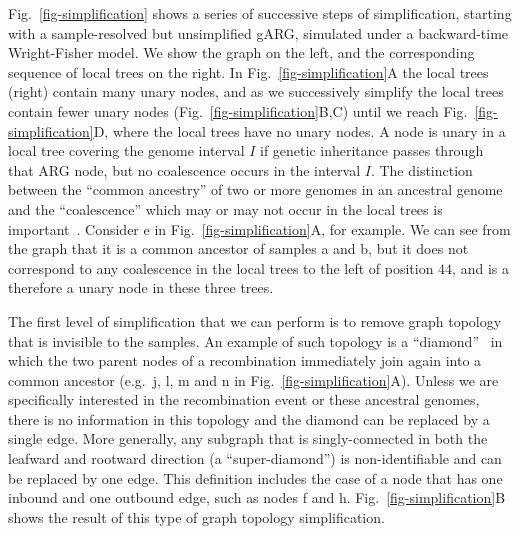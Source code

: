 \documentclass{article}
\newcommand{\noderef}[1]{\textsf{#1}}
\begin{document}
Fig.~\ref{fig-simplification} shows a series of successive steps of
simplification,
starting with a sample-resolved but unsimplified gARG, simulated under a
backward-time Wright-Fisher
model. We show the graph on the left, and the corresponding sequence of
local trees on the right.
In Fig.~\ref{fig-simplification}A the local trees (right)
contain many unary nodes, and as we successively simplify
the local trees contain fewer
unary nodes (Fig.~\ref{fig-simplification}B,C) until
we reach Fig.~\ref{fig-simplification}D, where the local trees
have no unary nodes.
A node is unary in a local tree covering the genome interval $I$
if genetic inheritance passes through that ARG node,
but no coalescence occurs in the interval $I$.
The distinction between the ``common ancestry'' of two or more genomes
in an ancestral genome and the ``coalescence'' which may or may
not occur in the local trees is
important~\citep{hudson1983testing,kelleher2016efficient}.
Consider \noderef{e} in Fig.~\ref{fig-simplification}A,
for example. We can see from the graph that it is a common
ancestor of  samples \noderef{a} and \noderef{b}, but
it does not correspond to any coalescence in the
local trees to the left of position $44$, and is a therefore a
unary node in these three trees.

The first level of simplification that we can perform is to remove
graph topology that is invisible to the samples.
An example of such topology is a
``diamond''~\citep{rasmussen2014genome}
in which the two parent nodes of a recombination immediately
join again into a common ancestor (e.g.~\noderef{j}, \noderef{l}, \noderef{m}
and \noderef{n} in Fig.~\ref{fig-simplification}A).
Unless we are specifically
interested in the recombination event or these ancestral genomes,
there is no information in this topology and the diamond can be
replaced by a single edge. More generally, any
subgraph that is singly-connected in both the leafward and
rootward direction (a ``super-diamond'') is non-identifiable and can be
replaced by one edge. This definition includes the case
of a node that has one inbound and one outbound edge, such as
nodes \noderef{f} and \noderef{h}.
Fig.~\ref{fig-simplification}B shows the result of this type of
graph topology simplification.
\end{document}
